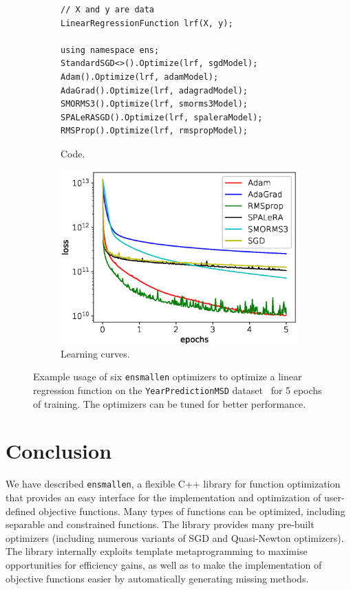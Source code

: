 \documentclass{article}
\begin{document}
\begin{figure}[b!]
\centering
\begin{subfigure}[b]{0.49\textwidth}
\begin{verbatim}
// X and y are data
LinearRegressionFunction lrf(X, y);

using namespace ens;
StandardSGD<>().Optimize(lrf, sgdModel);
Adam().Optimize(lrf, adamModel);
AdaGrad().Optimize(lrf, adagradModel);
SMORMS3().Optimize(lrf, smorms3Model);
SPALeRASGD().Optimize(lrf, spaleraModel);
RMSProp().Optimize(lrf, rmspropModel);
\end{verbatim}
\caption{Code.}
\end{subfigure}
\begin{subfigure}[b]{0.49\textwidth}
  \centering
  \includegraphics[width=\textwidth,height=0.6\textwidth]{experiments/learning_curves_crop.eps}
\caption{Learning curves.}
\end{subfigure}
\caption{\footnotesize
Example usage of six \texttt{\small ensmallen} optimizers to optimize a
linear regression function on the \texttt{\small YearPredictionMSD}
dataset~\cite{ucimlrepository} for 5 epochs of training.  The optimizers can be
tuned for better performance.}
\label{fig:learning_curve}
\vspace*{-1ex}
\end{figure}

\vspace*{-0.3em}
\section{Conclusion}
\vspace*{-0.5em}

We have described {\tt ensmallen}, a flexible C++ library for function
optimization that provides an easy interface for the implementation and optimization
of user-defined objective functions.  Many types of functions can be optimized,
including separable and constrained functions.
The library provides many pre-built optimizers (including numerous variants
of SGD and Quasi-Newton optimizers).
The library internally exploits template metaprogramming
to maximise opportunities for efficiency gains,
as well as 
to make the implementation of objective functions easier
by automatically generating missing methods.
\end{document}
